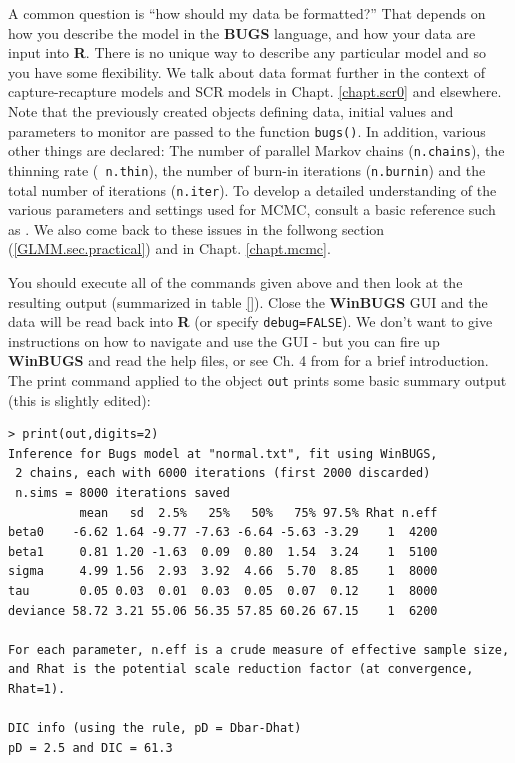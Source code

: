 A common question is ``how should my data be formatted?'' That depends
on how you describe the model in the {\bf BUGS} language, and how your
data are input into {\bf R}.  There is no unique way to describe any
particular model and so you have some flexibility. We talk about data
format further in the context of capture-recapture models and SCR
models in Chapt. \ref{chapt.scr0} and elsewhere. Note that the
previously created objects defining data, initial values and
parameters to monitor are passed to the function \mbox{\tt bugs()}.
In addition, various other things are declared: The number of parallel
Markov chains (\mbox{\tt n.chains}), the thinning rate (\mbox{\tt
  n.thin}), the number of burn-in iterations (\mbox{\tt n.burnin}) and
the total number of iterations (\mbox{\tt n.iter}).  To develop a
detailed understanding of the various parameters and settings used for
MCMC, consult a basic reference such as \citet{kery:2010}. We also come back to these issues in the follwong section (\ref{GLMM.sec.practical}) and in Chapt. \ref{chapt.mcmc}.



You should execute all of the commands given above and then look at
the resulting output (summarized in table \ref{}). Close the {\bf WinBUGS} GUI and the data will be
read back into {\bf R} (or specify \mbox{\tt debug=FALSE}).  We don't
want to give instructions on how to navigate and use the GUI - but you
can fire up {\bf WinBUGS} and read the help files, or see Ch. 4 from
\citet{kery:2010} for a brief introduction.
The print command applied to the object \mbox{\tt out} prints some
basic summary output (this is slightly edited):

{\small
\begin{verbatim}
> print(out,digits=2)
Inference for Bugs model at "normal.txt", fit using WinBUGS,
 2 chains, each with 6000 iterations (first 2000 discarded)
 n.sims = 8000 iterations saved
          mean   sd  2.5%   25%   50%   75% 97.5% Rhat n.eff
beta0    -6.62 1.64 -9.77 -7.63 -6.64 -5.63 -3.29    1  4200
beta1     0.81 1.20 -1.63  0.09  0.80  1.54  3.24    1  5100
sigma     4.99 1.56  2.93  3.92  4.66  5.70  8.85    1  8000
tau       0.05 0.03  0.01  0.03  0.05  0.07  0.12    1  8000
deviance 58.72 3.21 55.06 56.35 57.85 60.26 67.15    1  6200

For each parameter, n.eff is a crude measure of effective sample size,
and Rhat is the potential scale reduction factor (at convergence, Rhat=1).

DIC info (using the rule, pD = Dbar-Dhat)
pD = 2.5 and DIC = 61.3
\end{verbatim}
}

